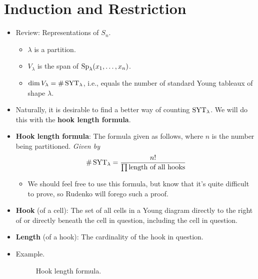 \documentclass[../notes.tex]{subfiles}
\begin{document}
\section{Induction and Restriction}
\begin{itemize}
    \item {}Review: Representations of $S_n$.
    \begin{itemize}
        \item $\lambda$ is a partition.
        \item $V_\lambda$ is the span of $\operatorname{Sp}_\lambda(x_1,\dots,x_n)$.
        \item $\dim V_\lambda=\#\operatorname{SYT}_\lambda$, i.e., equals the number of standard Young tableaux of shape $\lambda$.
    \end{itemize}
    \item Naturally, it is desirable to find a better way of counting $\operatorname{SYT}_\lambda$. We will do this with the \textbf{hook length formula}.
    \item \textbf{Hook length formula}: The formula given as follows, where $n$ is the number being partitioned. \emph{Given by}
    \begin{equation*}
        \#\operatorname{SYT}_\lambda = \frac{n!}{\prod\text{length of all hooks}}
    \end{equation*}
    \begin{itemize}
        \item We should feel free to use this formula, but know that it's quite difficult to prove, so Rudenko will forego such a proof.
    \end{itemize}
    \item \textbf{Hook} (of a cell): The set of all cells in a Young diagram directly to the right of or directly beneath the cell in question, including the cell in question.
    \item \textbf{Length} (of a hook): The cardinality of the hook in question.
    \item Example.
    \begin{figure}[h!]
        \centering
        \caption{Hook length formula.}
        \label{fig:hookLengthForm}

\end{figure}
\end{itemize}
\end{document}
